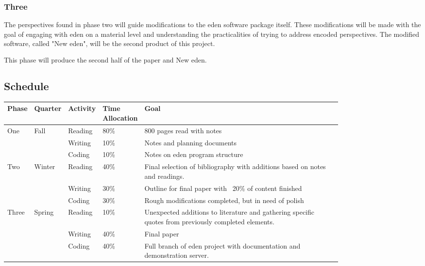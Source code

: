 \documentclass[a4paper,man,natbib]{apa6}
\begin{document}
   \subsubsection*{Three}
   The perspectives found in phase two will guide modifications to the \acrshort{eden} software package itself. These modifications will be made with the goal of engaging with \acrshort{eden} on a material level and understanding the practicalities of trying to address encoded perspectives. The modified software, called "New \acrshort{eden}", will be the second product of this project.
   \begin{flushleft}
   This phase will produce the second half of the paper and New \acrshort{eden}.
   \end{flushleft}
   \subsection*{Schedule}
   \begin{center}
   \begin{tabular}{|l|l|p{0.1\linewidth}|p{0.1\linewidth}|p{0.6\linewidth}|}
   \hline
   Phase & Quarter & Activity& Time Allocation & Goal                         \\ \hline
   One   & Fall    & Reading & 80\%            & 800 pages read with notes    \\ \cline{3-5} 
         &         & Writing & 10\%            & Notes and planning documents \\ \cline{3-5} 
         &         & Coding  & 10\%            & Notes on \acrshort{eden} program structure   \\ \hline 
   Two   & Winter  & Reading & 40\%            & Final selection of bibliography with additions based on notes and readings.   \\ \cline{3-5} 
         &         & Writing & 30\%            & Outline for final paper with ~20\% of content finished \\ \cline{3-5} 
         &         & Coding  & 30\%            & Rough modifications completed, but in need of polish  \\ \hline
   Three & Spring  & Reading & 10\%            & Unexpected additions to literature and gathering specific quotes from previously completed elements.   \\ \cline{3-5} 
         &         & Writing & 40\%            & Final paper \\ \cline{3-5}
         &         & Coding  & 40\%            & Full branch of \acrshort{eden} project with documentation and demonstration server. \\ \hline
   \end{tabular}
   \end{center}
\end{document}
